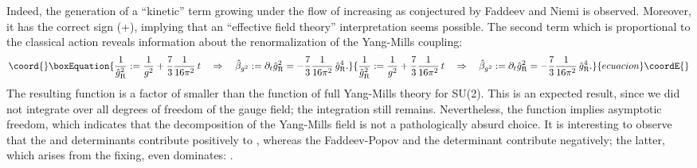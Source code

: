 \documentclass[a4paper,12pt]{article}
\begin{document}
Indeed, the generation of a ``kinetic'' term \coordHE{} growing under the flow of increasing \coordHE{} as
conjectured by Faddeev and Niemi is observed. Moreover, it has the
correct sign (+), implying that an ``effective field theory''
interpretation seems possible. The second term which is proportional
to the classical action reveals information about the renormalization
of the Yang-Mills coupling:
\begin{equation}\coord{}\boxEquation{
\frac{1}{\hat{g}_{\text{R}}^2} := \frac{1}{g^2} + \frac{7}{3}
\frac{1}{16\pi^2} \, t\quad \Rightarrow\quad
\hat{\beta}_{g^2}:=\partial_t \hat{g}_{\text{R}}^2 =-\frac{7}{3}
\frac{1}{16\pi^2} \, \hat{g}_{\text{R}}^4. \label{15}
}{
\frac{1}{\hat{g}_{\text{R}}^2} := \frac{1}{g^2} + \frac{7}{3}
\frac{1}{16\pi^2} \, t\quad \Rightarrow\quad
\hat{\beta}_{g^2}:=\partial_t \hat{g}_{\text{R}}^2 =-\frac{7}{3}
\frac{1}{16\pi^2} \, \hat{g}_{\text{R}}^4. }{ecuacion}\coordE{}\end{equation}
The resulting \myHighlight{$\hat{\beta}$}\coordHE{} function is a factor of \coordHE{} smaller
than the \myHighlight{$\beta$}\coordHE{} function of full Yang-Mills theory for SU(2). This is
an expected result, since we did not integrate over all degrees of
freedom of the gauge field; the \myHighlight{$\mn$}\coordHE{} integration still remains.
Nevertheless, the \myHighlight{$\hat{\beta}$}\coordHE{} function implies asymptotic freedom, 
which indicates that the decomposition of the Yang-Mills field is not
a pathologically absurd choice. It is interesting to observe that the
\coordHE{} and \myHighlight{$\mW$}\coordHE{} determinants contribute positively to
\coordHE{}, whereas the Faddeev-Popov and the \myHighlight{$\mF$}\coordHE{}
determinant contribute negatively; the latter, which arises from the
\myHighlight{$\mW$}\coordHE{} fixing, even dominates: \coordHE{}.
\end{document}
